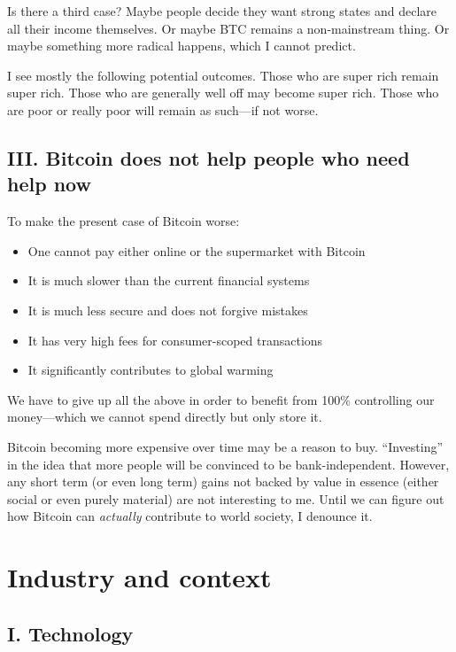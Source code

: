 Is there a third case? Maybe people decide they want strong states and declare all their income themselves. Or maybe BTC remains a non-mainstream thing. Or maybe something more radical happens, which I cannot predict.

I see mostly the following potential outcomes. Those who are super rich remain super rich. Those who are generally well off may become super rich. Those who are poor or really poor will remain as such—if not worse.

\subsection{III. Bitcoin does not help people who need help now}

To make the present case of Bitcoin worse:

\begin{itemize}
    \item{One cannot pay either online or the supermarket with Bitcoin}
    \item{It is much slower than the current financial systems}
    \item{It is much less secure and does not forgive mistakes}
    \item{It has very high fees for consumer-scoped transactions}
    \item{It significantly contributes to global warming}
\end{itemize}

We have to give up all the above in order to benefit from 100\% controlling our money—which we cannot spend directly but only store it.

Bitcoin becoming more expensive over time may be a reason to buy. “Investing” in the idea that more people will be convinced to be bank-independent. However, any short term (or even long term) gains not backed by value in essence (either social or even purely material) are not interesting to me. Until we can figure out how Bitcoin can \emph{actually} contribute to world society, I denounce it.

\section{Industry and context}

\subsection{I. Technology}


